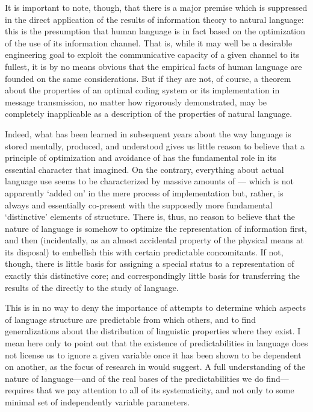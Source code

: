 It is important to note, though, that there is a major premise which
is suppressed in the direct application of the results of information
theory to natural language: this is the presumption that human
language is in fact based on the optimization of the use of its
information channel. That is, while it may well be a desirable
engineering goal to exploit the communicative capacity of a given
channel to its fullest, it is by no means obvious that the empirical
facts of human language are founded on the same considerations. But if
they are not, of course, a theorem about the properties of an optimal
coding system or its implementation in message transmission, no matter
how rigorously demonstrated, may be completely inapplicable as a
description of the properties of natural language.

Indeed, what has been learned in subsequent years about the way
language is stored mentally, produced, and understood gives us little
reason to believe that a principle of optimization and avoidance of
 has the fundamental role in its essential character that
{\Jakobson} imagined. On the contrary, everything about actual language
use seems to be characterized by massive amounts of
— which is not apparently `added on' in the mere
process of implementation but, rather, is always and essentially
co-present with the supposedly more fundamental `distinctive' elements
of structure. There is, thus, no reason to believe that the nature of
language is somehow to optimize the representation of information
first, and then (incidentally, as an almost accidental property of the
physical means at its disposal) to embellish this with certain
predictable concomitants. If not, though, there is little basis for
assigning a special status to a representation of exactly this
distinctive core; and correspondingly little basis for transferring
the results of the  directly to
the study of language.

This is in no way to deny the importance of attempts to determine
which aspects of language structure are predictable from which others,
and to find generalizations about the distribution of linguistic
properties where they exist. I mean here only to point out that the
existence of predictabilities in language does not license us to
ignore a given variable once it has been shown to be dependent on
another, as the focus of research in  would
suggest. A full understanding of the nature of language—and of the
real bases of the predictabilities we do find—requires that we pay
attention to all of its systematicity, and not only to some minimal
set of independently variable parameters.

